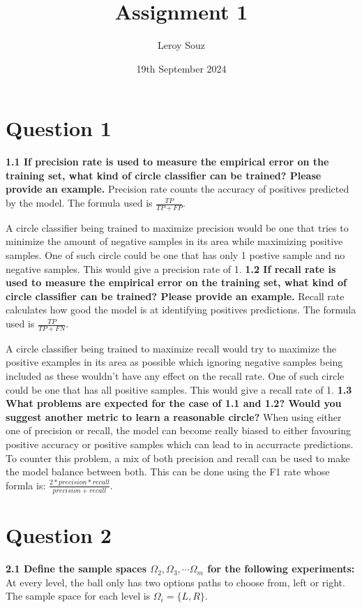 \documentclass{article}
\title{Assignment 1}
\author{Leroy Souz}
\date{19th September 2024}
\begin{document}
\maketitle

\section*{Question 1}

\noindent \textbf{1.1 If precision rate is used to measure the empirical error on the training set, what kind of circle classifier can be trained? Please provide an example.} \newline
Precision rate counts the accuracy of positives predicted by the model. The formula used is $\frac{TP}{TP+FP}$.

\noindent A circle classifier being trained to maximize precision would be one that tries to minimize the amount of negative samples in its area while maximizing positive samples. 
One of such circle could be one that has only 1 postive sample and no negative samples. This would give a precision rate of 1.
\bigbreak
\noindent \textbf{1.2 If recall rate is used to measure the empirical error on the training set, what kind of circle classifier can be trained? Please provide an example.} \newline
Recall rate calculates how good the model is at identifying positives predictions. The formula used is $\frac{TP}{TP+FN}$.

\noindent A circle classifier being trained to maximize recall would try to maximize the positive examples in its area as possible which ignoring negative samples being included as these wouldn't have any effect on the recall rate.
One of such circle could be one that has all positive samples. This would give a recall rate of 1.
\bigbreak
\noindent \textbf{1.3 What problems are expected for the case of 1.1 and 1.2? Would you suggest another metric to learn a reasonable circle?} \newline
When using either one of precision or recall, the model can become really biased to either favouring positive accuracy or positive samples which can lead to in accurracte predictions. To counter this problem, a mix of both precision and recall can be used to make the model balance between both. This can be done using the F1 rate whose formla is: $\frac{2*precision*recall}{precision+recall}$.


\section*{Question 2}
\noindent \textbf{2.1 Define the sample spaces $\Omega_2, \Omega_3, \cdots \Omega_m$ for the following experiments:}
At every level, the ball only has two options paths to choose from, left or right. The sample space for each level is
$\Omega_i = \{L, R\}$.
\end{document}
